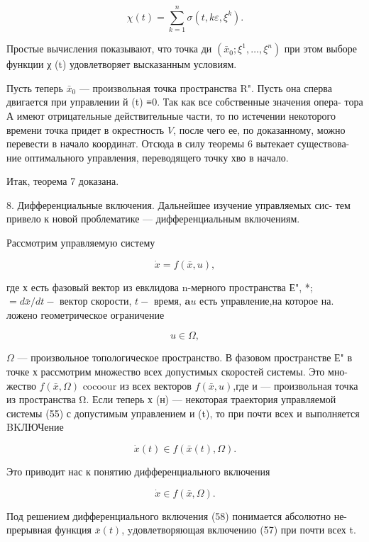 \documentclass[10pt]{article}
\begin{document}
\[
\chi \left( t\right)  = \mathop{\sum }\limits_{{k = 1}}^{n}\sigma \left( {t,{k\varepsilon },{\xi }^{k}}\right).
\]

Простые вычисления показывают, что точка ди \(\left( {{\bar{x}}_{0};{\xi }^{1},\ldots,{\xi }^{n}}\right)\) при этом выборе функции χ (t) удовлетворяет высказанным условиям.

Пусть теперь \({\bar{x}}_{0}\) — произвольная точка пространства R". Пусть она сперва двигается при управлении й (t) ≡0. Так как все собственные значения опера- тора А имеют отрицательные действительные части, то по истечении некоторого времени точка придет в окрестность \(V\), после чего ее, по доказанному, можно перевести в начало координат. Отсюда в силу теоремы 6 вытекает существова- ние оптимального управления, переводящего точку хво в начало.

Итак, теорема 7 доказана.

8. Дифференциальные включения. Дальнейшее изучение управляемых сис- тем привело к новой проблематике — дифференциальным включениям.

Рассмотрим управляемую систему

\[
\dot{x} = f\left( {\bar{x},u}\right), \tag{55}
\]

где х есть фазовый вектор из евклидова n-мерного пространства Е", *; \(= d\bar{x}/{dt} -\) вектор скорости, \(t -\) время, \(\mathbf{a}u\) есть управление,на которое на. ложено геометрическое ограничение

\[
u \in  \Omega, \tag{56}
\]

\(\Omega\) — произвольное топологическое пространство. В фазовом пространстве Е" в точке х рассмотрим множество всех допустимых скоростей системы. Это мно- жество \(f\left( {\bar{x},\Omega }\right)\) cocoour из всех векторов \(f\left( {\bar{x},u}\right)\),где и — произвольная точка из пространства Ω. Если теперь х (н) — некоторая траектория управляемой системы (55) с допустимым управлением и (t), то при почти всех и выполняется BKЛЮЧение

\[
\dot{x}\left( t\right)  \in  f\left( {\bar{x}\left( t\right),\Omega }\right). \tag{57}
\]

Это приводит нас к понятию дифференциального включения

\[
\dot{x} \in  f\left( {\bar{x},\Omega }\right). \tag{58}
\]

Под решением дифференциального включения (58) понимается абсолютно не- прерывная функция \(\bar{x}\left( t\right)\), yдовлетворяющая включению (57) при почти всех t.
\end{document}
